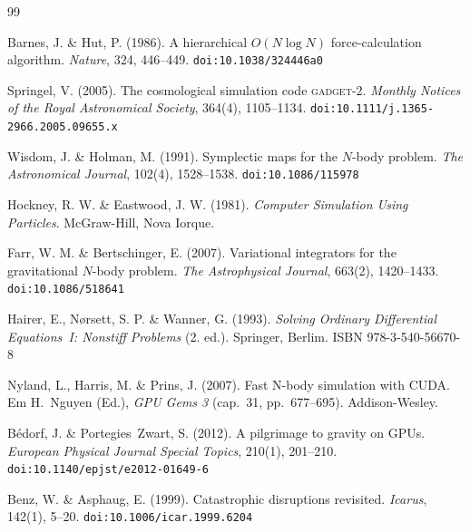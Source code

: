 \documentclass[12pt,a4paper]{article}
\begin{document}
\newpage
{}
\begin{thebibliography}{99}


Barnes, J. \& Hut, P. (1986).
A hierarchical $O(N \log N)$ force-calculation algorithm.
\textit{Nature}, 324, 446--449.
\texttt{doi:10.1038/324446a0}

Springel, V. (2005).
The cosmological simulation code \textsc{gadget}-2.
\textit{Monthly Notices of the Royal Astronomical Society}, 364(4), 1105--1134.
\texttt{doi:10.1111/j.1365-2966.2005.09655.x}

Wisdom, J. \& Holman, M. (1991).
Symplectic maps for the $N$-body problem.
\textit{The Astronomical Journal}, 102(4), 1528--1538.
\texttt{doi:10.1086/115978}

Hockney, R. W. \& Eastwood, J. W. (1981).
\textit{Computer Simulation Using Particles}.
McGraw-Hill, Nova Iorque.

Farr, W. M. \& Bertschinger, E. (2007).
Variational integrators for the gravitational $N$-body problem.
\textit{The Astrophysical Journal}, 663(2), 1420--1433.
\texttt{doi:10.1086/518641}

Hairer, E., N\o{}rsett, S. P. \& Wanner, G. (1993).
\textit{Solving Ordinary Differential Equations~I: Nonstiff Problems} (2.\textordfeminine{} ed.).
Springer, Berlim.
ISBN 978-3-540-56670-8


Nyland, L., Harris, M. \& Prins, J. (2007).
Fast N-body simulation with CUDA.
Em H.~Nguyen (Ed.), \textit{GPU Gems 3} (cap.~31, pp.~677--695).
Addison-Wesley.

B\'{e}dorf, J. \& Portegies~Zwart, S. (2012).
A pilgrimage to gravity on GPUs.
\textit{European Physical Journal Special Topics}, 210(1), 201--210.
\texttt{doi:10.1140/epjst/e2012-01649-6}


Benz, W. \& Asphaug, E. (1999).
Catastrophic disruptions revisited.
\textit{Icarus}, 142(1), 5--20.
\texttt{doi:10.1006/icar.1999.6204}


\end{thebibliography}
\end{document}
